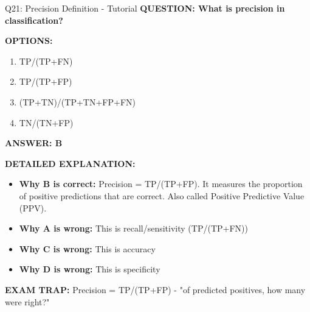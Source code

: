 \documentclass[8pt]{beamer}
\begin{document}
	\begin{frame}{Q21: Precision Definition - Tutorial}
		\fontsize{6.5}{7.5}\selectfont
		\textbf{QUESTION: What is precision in classification?}
		
		\vspace{0.1cm}
		\textbf{OPTIONS:}
		\begin{enumerate}
			\item TP/(TP+FN)
			\item TP/(TP+FP)
			\item (TP+TN)/(TP+TN+FP+FN)
			\item TN/(TN+FP)
		\end{enumerate}
		
		\vspace{0.1cm}
		\textcolor{myblue}{\textbf{ANSWER: B}}
		
		\vspace{0.1cm}
		\textbf{DETAILED EXPLANATION:}
		\begin{itemize}
			\item \textbf{Why B is correct:} Precision = TP/(TP+FP). It measures the proportion of positive predictions that are correct. Also called Positive Predictive Value (PPV).
			\item \textbf{Why A is wrong:} This is recall/sensitivity (TP/(TP+FN))
			\item \textbf{Why C is wrong:} This is accuracy
			\item \textbf{Why D is wrong:} This is specificity
		\end{itemize}
		
		\textcolor{myred}{\textbf{EXAM TRAP:}} Precision = \textcolor{myblue}{TP/(TP+FP)} - "of predicted positives, how many were right?"
	\end{frame}
	
\end{document}
